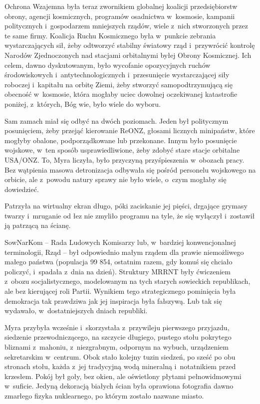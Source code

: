 \documentclass[oneside,polish,11pt,sfheadings]{mwbk}
\begin{document}
Ochrona Wzajemna była teraz zwornikiem globalnej koalicji
przedsiębiorstw obrony, agencji kosmicznych, programów osadnictwa w~kosmosie, kampanii politycznych i~gospodarzem mniejszych rządów, wiele z~nich stworzonych przez te same firmy. Koalicja Ruchu Kosmicznego była w~punkcie zebrania wystarczających sił, żeby odtworzyć stabilny światowy
rząd i~przywrócić kontrolę Narodów Zjednoczonych nad stacjami
orbitalnymi byłej Obrony Kosmicznej. Ich celem, dawno dyskutowanym, było
wycofanie opozycyjnych ruchów środowiskowych i~antytechnologicznych i~przesunięcie wystarczającej siły roboczej i~kapitału na orbitę Ziemi,
żeby stworzyć samopodtrzymującą się obecność w~kosmosie, która mogłaby
uciec dowolnej oczekiwanej katastrofie poniżej, z~których, Bóg wie, było
wiele do wyboru.

Sam zamach miał się odbyć na dwóch poziomach. Jeden był politycznym
posunięciem, żeby przejąć kierowanie ReONZ, głosami licznych minipaństw,
które mogłyby obalone, podporządkowane lub przekonane. Innym było
posunięcie wojskowe, w~ten sposób usprawiedliwione, żeby zdobyć stare
stacje orbitalne USA/ONZ. To, Myra liczyła, było przyczyną
przyśpieszenia w~obozach pracy. Bez wątpienia masowa detronizacja
odbywała się pośród personelu wojskowego na orbicie, ale z~powodu natury
sprawy nie było wiele, o~czym mogłaby się dowiedzieć.

Patrzyła na wirtualny ekran długo, póki zaciskanie jej pięści, drgające
grymasy twarzy i~mruganie od łez nie zmyliło programu na tyle, że się
wyłączył i~zostawił ją patrzącą na ścianę.

SowNarKom -- Rada Ludowych Komisarzy lub, w~bardziej konwencjonalnej
terminologii, Rząd -- był odpowiednio małym rządem dla prawie
niemożliwego małego państwa (populacja 99 854, ostatnim razem, gdy komuś
się chciało policzyć, i~spadała z~dnia na dzień). Struktury MRRNT były
ćwiczeniem z~obozu socjalistycznego, modelowanym na tych starych
sowieckich republikach, ale bez kierującej roli Partii. Wynikiem tego
strategicznego pominięcia była demokracja tak prawdziwa jak jej
inspiracja była fałszywą. Lub tak się wydawało, w~dostatniejszych dniach
republiki.

Myra przybyła wcześnie i~skorzystała z~przywileju pierwszego przyjazdu,
siedzenie przewodniczącego, na szczycie długiego, pustego stołu
pokrytego bliznami z~mahoniu, z~niezgrabnym, odpornym na wybuch,
urządzeniem sekretarskim w~centrum. Obok stało kolejny tuzin siedzeń, po
sześć po obu stronach stołu, każda z~jej tradycyjną wodą mineralną i~notatnikiem przed krzesłem. Pokój był goły, bez okien, ale oświetlony
płytami pełnowidmowymi w~suficie. Jedyną dekoracją białych ścian była
oprawiona fotografia dawno zmarłego fizyka nuklearnego, po którym zostało
nazwane miasto.
\end{document}

